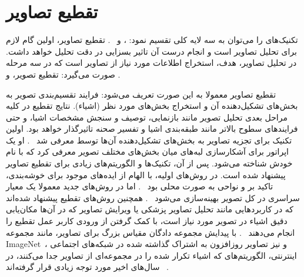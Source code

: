 \chapter{تقطیع تصاویر} \label{ch:imageSegmentation}
تکنیک‌های
{}
را می‌توان به سه لایه کلی تقسیم نمود:
{}،
{}
و
{}%
~\cite{zhang_advances_2006}.
تقطیع تصاویر، اولین گام لازم برای تحلیل تصاویر است و انجام درست آن تاثیر بسزایی در دقت تحلیل خواهد داشت. در تحلیل تصاویر، هدف، استخراج اطلاعات مورد نیاز از تصاویر است که در سه مرحله صورت می‌گیرد: تقطیع تصویر،
{}
و
{}.

\iffalse
کار مشابه تقطیع تصاویر در علم آمار،
{\mmm{آنالیز خوشه‌ها}{cluster analysis}}
است که پژوهش‌های زیادی روی آن انجام شده و صدها الگوریتم برای آن پیشنهاد شده است.
\fi

تقطیع تصاویر معمولا به این صورت تعریف می‌شود: فرایند تقسیم‌بندی تصویر به بخش‌های تشکیل‌دهنده آن و استخراج بخش‌های مورد نظر (اشیاء).
نتایج تقطیع در کلیه مراحل بعدی تحلیل تصویر مانند بازنمایی، توصیف و سنجش مشخصات اشیا، و حتی فرایندهای سطوح بالاتر مانند طبقه‌بندی اشیا و تفسیر صحنه تاثیرگذار خواهد بود.
اولین تکنیک برای تجزیه تصاویر به بخش‌های تشکیل‌دهنده آن‌ها توسط
معرفی شد%
~\cite{zhang_advances_2006}.
او یک اپراتور برای آشکارسازی لبه‌های میان بخش‌های مختلف تصویر معرفی کرد که با نام خودش شناخته می‌شود.
پس از آن، تکنیک‌ها و الگوریتم‌های زیادی برای تقطیع تصاویر پیشنهاد شده است.
در روش‌های اولیه، با الهام از ایده‌های موجود برای خوشه‌بندی، تاکید بر
{}
و
{}
نواحی به صورت محلی بود%
~\cite{ohlander_picture_1978, brice_scene_1970}.
اما در روش‌های جدید معمولا یک معیار سراسری در کل تصویر بهینه‌سازی می‌شود%
~\cite{comaniciu_mean_2002, felzenszwalb_efficient_2004, shi_normalized_2000, chan_active_2001, beare_locally_2006}.
همچنین روش‌های تقطیع
{}
پیشنهاد شده‌اند که در کاربردهایی مانند تحلیل تصاویر پزشکی یا ویرایش تصاویر که در آن‌ها مکان‌یابی دقیق اشیاء در تصویر مورد نیاز است، با کمک گرفتن از ورودی کاربر عمل تقطیع را انجام می‌دهند%
~\cite{rother_grabcut_2004, nguyen_robust_2012}.
با پیدایش مجموعه دادگان مقیاس بزرگ برای تصاویر، مانند مجموعه
ImageNet~\cite{deng_imagenet_2009}،
و نیز تصاویر روزافزون به اشتراک گذاشته شده در شبکه‌های اجتماعی اینترنتی، الگوریتم‌های
{}
که اشیاء تکرار شده را در مجموعه‌ای از تصاویر جدا می‌کنند، در سال‌های اخیر مورد توجه زیادی قرار گرفته‌اند%
~\cite{rother_cosegmentation_2006, kim_multiple_2012, joulin_multiclass_2012}.

